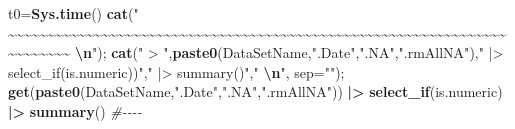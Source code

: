 \documentclass[
]{article}
\newenvironment{Shaded}{\begin{snugshade}}{\end{snugshade}}
\newcommand{\AttributeTok}[1]{\textcolor[rgb]{0.13,0.29,0.53}{#1}}
\newcommand{\CommentTok}[1]{\textcolor[rgb]{0.56,0.35,0.01}{\textit{#1}}}
\newcommand{\FunctionTok}[1]{\textcolor[rgb]{0.13,0.29,0.53}{\textbf{#1}}}
\newcommand{\NormalTok}[1]{#1}
\newcommand{\OtherTok}[1]{\textcolor[rgb]{0.56,0.35,0.01}{#1}}
\newcommand{\SpecialCharTok}[1]{\textcolor[rgb]{0.81,0.36,0.00}{\textbf{#1}}}
\newcommand{\StringTok}[1]{\textcolor[rgb]{0.31,0.60,0.02}{#1}}
\begin{document}
\begin{Shaded}
\begin{Highlighting}[]
  
\NormalTok{t0}\OtherTok{=}\FunctionTok{Sys.time}\NormalTok{()}
\FunctionTok{cat}\NormalTok{(}\StringTok{"    \textasciitilde{}\textasciitilde{}\textasciitilde{}\textasciitilde{}\textasciitilde{}\textasciitilde{}\textasciitilde{}\textasciitilde{}\textasciitilde{}\textasciitilde{}\textasciitilde{}\textasciitilde{}\textasciitilde{}\textasciitilde{}\textasciitilde{}\textasciitilde{}\textasciitilde{}\textasciitilde{}\textasciitilde{}\textasciitilde{}\textasciitilde{}\textasciitilde{}\textasciitilde{}\textasciitilde{}\textasciitilde{}\textasciitilde{}\textasciitilde{}\textasciitilde{}\textasciitilde{}\textasciitilde{}\textasciitilde{}\textasciitilde{}\textasciitilde{}\textasciitilde{}\textasciitilde{}\textasciitilde{}\textasciitilde{}\textasciitilde{}\textasciitilde{}\textasciitilde{}\textasciitilde{}\textasciitilde{}\textasciitilde{}\textasciitilde{}\textasciitilde{}\textasciitilde{}\textasciitilde{}\textasciitilde{}\textasciitilde{}\textasciitilde{}\textasciitilde{}\textasciitilde{}\textasciitilde{}\textasciitilde{}\textasciitilde{}\textasciitilde{}\textasciitilde{}\textasciitilde{}\textasciitilde{}\textasciitilde{}\textasciitilde{}\textasciitilde{}\textasciitilde{}\textasciitilde{}\textasciitilde{}\textasciitilde{}\textasciitilde{}\textasciitilde{}\textasciitilde{}\textasciitilde{}\textasciitilde{}\textasciitilde{}    }\SpecialCharTok{\textbackslash{}n}\StringTok{"}\NormalTok{); }\FunctionTok{cat}\NormalTok{(}\StringTok{" \textgreater{} "}\NormalTok{,}\FunctionTok{paste0}\NormalTok{(DataSetName,}\StringTok{".Date"}\NormalTok{,}\StringTok{".NA"}\NormalTok{,}\StringTok{".rmAllNA"}\NormalTok{),}\StringTok{" |\textgreater{} select\_if(is.numeric))"}\NormalTok{,}\StringTok{" |\textgreater{} summary()"}\NormalTok{,}\StringTok{"  }\SpecialCharTok{\textbackslash{}n}\StringTok{"}\NormalTok{, }\AttributeTok{sep=}\StringTok{""}\NormalTok{); }\FunctionTok{get}\NormalTok{(}\FunctionTok{paste0}\NormalTok{(DataSetName,}\StringTok{".Date"}\NormalTok{,}\StringTok{".NA"}\NormalTok{,}\StringTok{".rmAllNA"}\NormalTok{)) }\SpecialCharTok{|\textgreater{}} \FunctionTok{select\_if}\NormalTok{(is.numeric) }\SpecialCharTok{|\textgreater{}} \FunctionTok{summary}\NormalTok{() }\CommentTok{\#{-}{-}{-}{-}  }

\end{Highlighting}
\end{Shaded}
\end{document}
